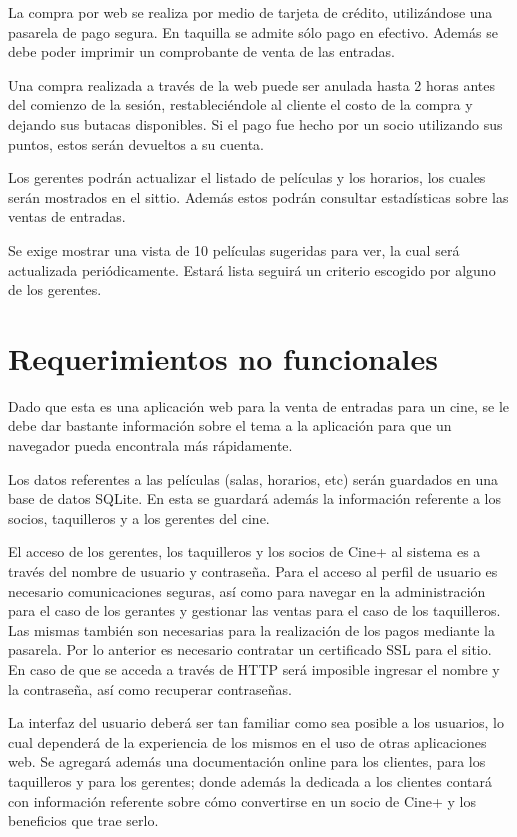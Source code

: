 \documentclass[letterpaper,12pt, oneside, onecolumn, openany]{book}
\begin{document}
La compra por web se realiza por medio de tarjeta de crédito, utilizándose una pasarela de pago segura. En taquilla se admite sólo pago en efectivo. Además se debe poder imprimir un comprobante de venta de las entradas.

Una compra realizada a través de la web puede ser anulada hasta 2 horas antes del comienzo  de la sesión, restableciéndole al cliente el costo de la compra y dejando sus butacas disponibles. Si el pago fue hecho por un socio utilizando sus puntos, estos serán devueltos a su cuenta.

Los gerentes podrán actualizar el listado de películas y los horarios, los cuales serán mostrados en el sittio. Además estos podrán consultar estadísticas sobre las ventas de entradas.

Se exige mostrar una vista de 10 películas sugeridas para ver, la cual será actualizada periódicamente. Estará lista seguirá un criterio escogido por alguno de los gerentes.

\section{Requerimientos no funcionales}

Dado que esta es una aplicación web para la venta de entradas para un cine, se le debe dar bastante información sobre el tema a la aplicación para que un navegador pueda encontrala más rápidamente.

Los datos referentes a las películas (salas, horarios, etc) serán guardados en una base de datos SQLite. En esta se guardará además la información referente a los socios, taquilleros y a los gerentes del cine.

El acceso de los gerentes, los taquilleros y los socios de Cine+ al sistema es a través del nombre de usuario y contraseña. Para el acceso al perfil de usuario es necesario comunicaciones seguras, así como para navegar en la administración para el caso de los gerantes y gestionar las ventas para el caso de los taquilleros. Las mismas también son necesarias para la realización de los pagos mediante la pasarela. Por lo anterior es necesario contratar un certificado SSL para el sitio. En caso de que se acceda a través de HTTP será imposible ingresar  el nombre y la contraseña, así como recuperar contraseñas.

La interfaz del usuario deberá ser tan familiar como sea posible a los usuarios, lo cual dependerá de la experiencia de los mismos en el uso de otras aplicaciones web. Se agregará además una documentación online para los clientes, para los taquilleros y  para los gerentes; donde además la dedicada a los clientes contará con información referente sobre cómo convertirse en un socio de Cine+ y los beneficios que trae serlo.
\end{document}
